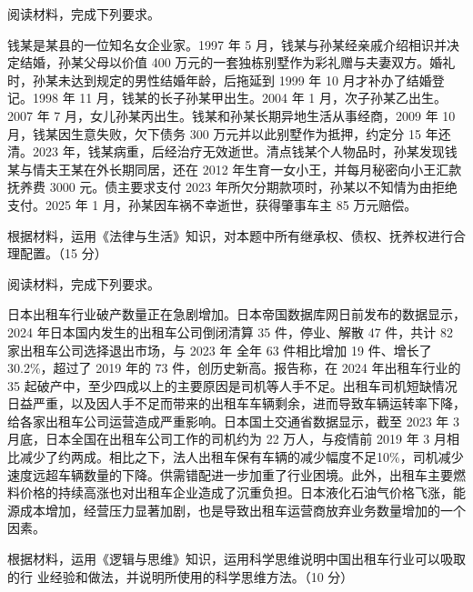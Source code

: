 \documentclass{exam-zh}
\newenvironment{kaiti-indented}{
  \parindent=2em
  \CJKfamily{zhkai}
  \setstretch{1.4}
}{
}
\begin{document}
\begin{question}
  阅读材料，完成下列要求。

  \begin{kaiti-indented}
    钱某是某县的一位知名女企业家。1997 年 5 月，钱某与孙某经亲戚介绍相识并决定结婚，孙某父母以价值 400 万元的一套独栋别墅作为彩礼赠与夫妻双方。婚礼时，孙某未达到规定的男性结婚年龄，后拖延到 1999 年 10 月才补办了结婚登记。1998 年 11 月，钱某的长子孙某甲出生。2004 年 1 月，次子孙某乙出生。2007 年 7 月，女儿孙某丙出生。钱某和孙某长期异地生活从事经商，2009 年 10 月，钱某因生意失败，欠下债务 300 万元并以此别墅作为抵押，约定分 15 年还清。2023 年，钱某病重，后经治疗无效逝世。清点钱某个人物品时，孙某发现钱某与情夫王某在外长期同居，还在 2012 年生育一女小王，并每月秘密向小王汇款抚养费 3000 元。债主要求支付 2023 年所欠分期款项时，孙某以不知情为由拒绝支付。2025 年 1 月，孙某因车祸不幸逝世，获得肇事车主 85 万元赔偿。
  \end{kaiti-indented}

  根据材料，运用《法律与生活》知识，对本题中所有继承权、债权、抚养权进行合理配置。（15 分）
\end{question}

\begin{question}
  阅读材料，完成下列要求。

  \begin{kaiti-indented}
    日本出租车行业破产数量正在急剧增加。日本帝国数据库网日前发布的数据显示，2024 年日本国内发生的出租车公司倒闭清算 35 件，停业、解散 47 件，共计 82 家出租车公司选择退出市场，与 2023 年 全年 63 件相比增加 19 件、增长了 30.2\%，超过了 2019 年的 73 件，创历史新高。报告称，在 2024 年出租车行业的 35 起破产中，至少四成以上的主要原因是司机等人手不足。出租车司机短缺情况日益严重，以及因人手不足而带来的出租车车辆剩余，进而导致车辆运转率下降，给各家出租车公司运营造成严重影响。日本国土交通省数据显示，截至 2023 年 3 月底，日本全国在出租车公司工作的司机约为 22 万人，与疫情前 2019 年 3 月相比减少了约两成。相比之下，法人出租车保有车辆的减少幅度不足10\%，司机减少速度远超车辆数量的下降。供需错配进一步加重了行业困境。此外，出租车主要燃料价格的持续高涨也对出租车企业造成了沉重负担。日本液化石油气价格飞涨，能源成本增加，经营压力显著加剧，也是导致出租车运营商放弃业务数量增加的一个因素。
  \end{kaiti-indented}

  根据材料，运用《逻辑与思维》知识，运用科学思维说明中国出租车行业可以吸取的行
  业经验和做法，并说明所使用的科学思维方法。（10 分）
\end{question}
\end{document}
